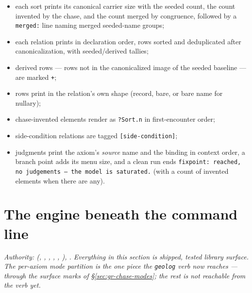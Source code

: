 \begin{itemize}
\item each sort prints its canonical carrier size with the seeded
count, the count invented by the chase, and the count merged by
congruence, followed by a \texttt{merged:} line naming merged
seeded-name groups;
\item each relation prints in declaration order, rows sorted and
deduplicated after canonicalization, with seeded/derived tallies;
\item derived rows — rows not in the canonicalized image of the
seeded baseline — are marked \texttt{+};
\item rows print in the relation's own shape (record, bare, or bare
name for nullary);
\item chase-invented elements render as \texttt{?Sort.n} in
first-encounter order;
\item side-condition relations are tagged \texttt{[side-condition]};
\item judgments print the axiom's \emph{source} name and the binding
in context order, a branch point adds its menu size, and a clean run
ends \texttt{fixpoint: reached, no judgements — the model is %
saturated.} (with a count of invented elements when there are any).
\end{itemize}

\section{The engine beneath the command line}
\label{sec:gr-engine}

\emph{Authority:  (,
, , ,
, ), .
Everything in this section is shipped, tested library surface. The
per-axiom mode partition is the one piece the \texttt{geolog} verb
now reaches — through the surface marks of
\S\ref{sec:gr-chase-modes}; the rest is not reachable from the verb
yet.}

